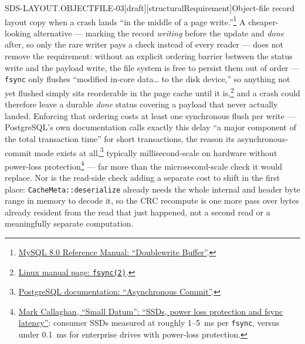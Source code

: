 \begin{requirement}{SDS-LAYOUT.OBJECTFILE-03}[draft][structuralRequirement]{Object-file record layout}
  copy when a crash lands ``in the middle of a page
  write.''\footnote{\href{https://dev.mysql.com/doc/refman/8.0/en/innodb-doublewrite-buffer.html}{MySQL
  8.0 Reference Manual: ``Doublewrite Buffer''}.} A cheaper-looking
  alternative --- marking the record \emph{writing} before the update and
  \emph{done} after, so only the rare writer pays a check instead of every
  reader --- does not remove the requirement: without an explicit ordering
  barrier between the status write and the payload write, the file system
  is free to persist them out of order --- \texttt{fsync} only flushes
  ``modified in-core data\ldots{} to the disk device,'' so anything not yet
  flushed simply sits reorderable in the page cache until it
  is,\footnote{\href{https://man7.org/linux/man-pages/man2/fsync.2.html}{Linux
  manual page: \texttt{fsync(2)}}.} and a crash could therefore leave a
  durable \emph{done} status covering a payload that never actually
  landed. Enforcing that ordering costs at least one synchronous flush per
  write --- PostgreSQL's own documentation calls exactly this delay ``a
  major component of the total transaction time'' for short transactions,
  the reason its asynchronous-commit mode exists at
  all,\footnote{\href{https://www.postgresql.org/docs/current/wal-async-commit.html}{PostgreSQL
  documentation: ``Asynchronous Commit''}.} typically millisecond-scale on
  hardware without power-loss
  protection\footnote{\href{https://smalldatum.blogspot.com/2026/01/ssds-power-loss-protection-and-fsync.html}{Mark
  Callaghan, ``Small Datum'': ``SSDs, power loss protection and fsync
  latency''}: consumer SSDs measured at roughly 1--5~ms per
  \texttt{fsync}, versus under 0.1~ms for enterprise drives with
  power-loss protection.} --- far more than the microsecond-scale check it
  would replace. Nor is the read-side check adding a separate cost to
  shift in the first place: \texttt{CacheMeta::deserialize} already needs
  the whole internal and header byte range in memory to decode it, so the
  CRC recompute is one more pass over bytes already resident from the read
  that just happened, not a second read or a meaningfully separate
  computation.


\end{requirement}
